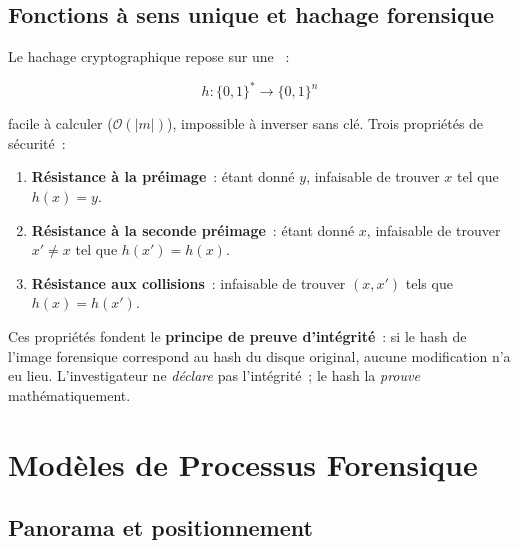 \subsection{Fonctions à sens unique et hachage forensique}

Le hachage cryptographique repose sur une
~:

\begin{equation}
h : \{0,1\}^* \to \{0,1\}^n
\label{eq:hash-def}
\end{equation}

facile à calculer ($\mathcal{O}(|m|)$), impossible à inverser sans clé.
Trois propriétés de sécurité~:
\begin{enumerate}
    \item \textbf{Résistance à la préimage}~: étant donné $y$, infaisable
          de trouver $x$ tel que $h(x) = y$.
    \item \textbf{Résistance à la seconde préimage}~: étant donné $x$,
          infaisable de trouver $x' \neq x$ tel que $h(x') = h(x)$.
    \item \textbf{Résistance aux collisions}~: infaisable de trouver
          $(x, x')$ tels que $h(x) = h(x')$.
\end{enumerate}

Ces propriétés fondent le \textbf{principe de preuve d'intégrité}~: si le
hash de l'image forensique correspond au hash du disque original, aucune
modification n'a eu lieu. L'investigateur ne \emph{déclare} pas l'intégrité~;
le hash la \emph{prouve} mathématiquement.

\section{Modèles de Processus Forensique}
\label{sec:modeles-processus}

\subsection{Panorama et positionnement}

